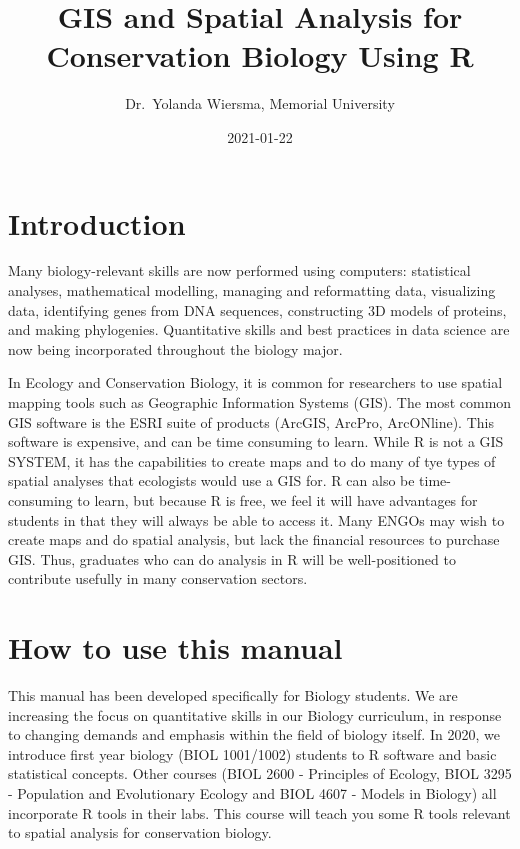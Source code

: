 \documentclass[
]{book}
\title{GIS and Spatial Analysis for Conservation Biology Using R}
\author{Dr.~Yolanda Wiersma, Memorial University}
\date{2021-01-22}
\begin{document}
\maketitle

{
\setcounter{tocdepth}{1}
\tableofcontents
}
\hypertarget{intro}{%
\chapter{Introduction}\label{intro}}

Many biology-relevant skills are now performed using computers: statistical analyses, mathematical modelling, managing and reformatting data, visualizing data, identifying genes from DNA sequences, constructing 3D models of proteins, and making phylogenies. Quantitative skills and best practices in data science are now being incorporated throughout the biology major.

In Ecology and Conservation Biology, it is common for researchers to use spatial mapping tools such as Geographic Information Systems (GIS). The most common GIS software is the ESRI suite of products (ArcGIS, ArcPro, ArcONline). This software is expensive, and can be time consuming to learn. While R is not a GIS SYSTEM, it has the capabilities to create maps and to do many of tye types of spatial analyses that ecologists would use a GIS for. R can also be time-consuming to learn, but because R is free, we feel it will have advantages for students in that they will always be able to access it. Many ENGOs may wish to create maps and do spatial analysis, but lack the financial resources to purchase GIS. Thus, graduates who can do analysis in R will be well-positioned to contribute usefully in many conservation sectors.

\hypertarget{howto}{%
\chapter{How to use this manual}\label{howto}}

This manual has been developed specifically for Biology students. We are increasing the focus on quantitative skills in our Biology curriculum, in response to changing demands and emphasis within the field of biology itself. In 2020, we introduce first year biology (BIOL 1001/1002) students to R software and basic statistical concepts. Other courses (BIOL 2600 - Principles of Ecology, BIOL 3295 - Population and Evolutionary Ecology and BIOL 4607 - Models in Biology) all incorporate R tools in their labs. This course will teach you some R tools relevant to spatial analysis for conservation biology.
\end{document}
